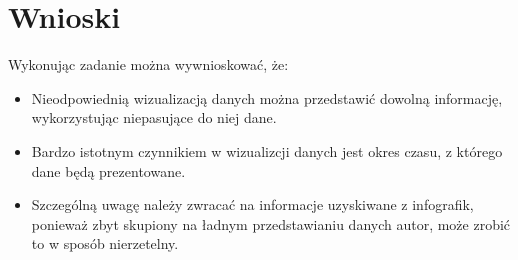 \documentclass{classrep}
\begin{document}
    
    \section{Wnioski} {
        Wykonując zadanie można wywnioskować, że:
        \begin{itemize}
            \item Nieodpowiednią wizualizacją danych można przedstawić dowolną informację, wykorzystując niepasujące do niej dane.
            \item Bardzo istotnym czynnikiem w wizualizcji danych jest okres czasu, z którego dane będą prezentowane.
            \item Szczególną uwagę należy zwracać na informacje uzyskiwane z infografik, ponieważ zbyt skupiony na ładnym przedstawianiu danych autor, może zrobić to w sposób nierzetelny.
        \end{itemize}
    }
\end{document}

